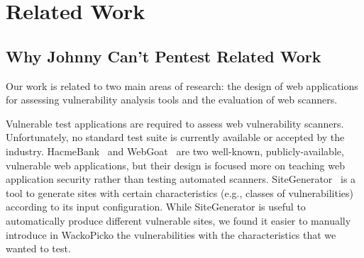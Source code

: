 \chapter{Related Work}

\section{Why Johnny Can't Pentest Related Work}
\label{sec:related_work}

Our work is related to two main areas of research: the design of 
web applications for assessing vulnerability analysis tools and the
evaluation of web scanners.

Vulnerable test applications are required to assess 
web vulnerability scanners. Unfortunately, no standard
test suite is currently available or accepted by the industry. 
HacmeBank~\cite{hacme_bank} and WebGoat~\cite{owasp-webgoat} are two
well-known, publicly-available, vulnerable web applications, but their
design is focused more on teaching web application security rather
than testing automated scanners. 
SiteGenerator~\cite{owasp_sitegenerator} is a tool to
generate sites with certain characteristics (e.g., classes of
vulnerabilities) according to its input configuration. 
While SiteGenerator is useful to automatically produce different vulnerable
sites, we found it easier to manually introduce in Wacko\-Picko the
vulnerabilities with the characteristics that we wanted to test.

